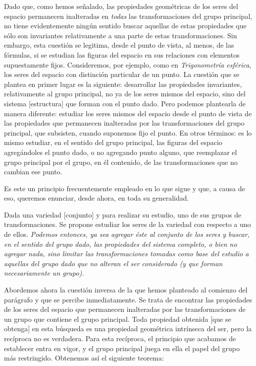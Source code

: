 \documentclass[a4paper, 12pt]{article}
\begin{document}
 Dado que, como hemos señalado, las propiedades geométricas de los seres del espacio permanecen inalteradas en \textit{todas} las transformaciones del grupo principal, no tiene evidentemente ningún sentido buscar aquellas de estas propiedades que sólo son invariantes relativamente a una parte de estas transformaciones. Sin embargo, esta cuestión se legitima, desde el punto de vista, al menos, de las fórmulas, si se estudian las figuras del espacio en sus relaciones con elementos supuestamente fijos. Consideremos, por ejemplo, como en \textit{Trigonometría esférica}, los seres del espacio con distinción particular de un punto. La cuestión que se plantea en primer lugar es la siguiente: desarrollar las propiedades invariantes, relativamente al grupo principal, no ya de los seres mismos del espacio, sino del sistema [estructura] que forman con el punto dado. Pero podemos plantearla de manera diferente: estudiar los seres mismos del espacio desde el punto de vista de las propiedades que permanecen inalteradas por las transformaciones del grupo principal, que subsisten, cuando suponemos fijo el punto. En otros términos: es lo mismo estudiar, en el sentido del grupo principal, las figuras del espacio agregándoles el punto dado, o no agregando punto alguno, que reemplazar el grupo principal por el grupo, en él contenido, de las transformaciones que no cambian ese punto.

Es este un principio frecuentemente empleado en lo que sigue y que, a causa de eso, queremos enunciar, desde ahora, en toda su generalidad.

Dada una variedad [conjunto] y para realizar su estudio, uno de sus grupos de transformaciones. Se propone estudiar los seres de la variedad con respecto a uno de ellos. \textit{Podemos entonces, ya sea agregar éste al conjunto de los seres y buscar, en el sentido del grupo dado, las propiedades del sistema completo, o bien no agregar nada, sino limitar las transformaciones tomadas como base del estudio a aquellas del grupo dado que no alteran el ser considerado (y que forman necesariamente un grupo).}

Abordemos ahora la cuestión inversa de la que hemos planteado al comienzo del parágrafo y que se percibe inmediatamente. Se trata de encontrar las propiedades de los seres del espacio que permanecen inalteradas por las transformaciones de un grupo que contiene el grupo principal. Toda propiedad obtenida [que se obtenga] en esta búsqueda es una propiedad geométrica intrínseca del ser, pero la recíproca no es verdadera. Para esta recíproca, el principio que acabamos de establecer entra en vigor, y el grupo principal juega en ella el papel del grupo más restringido. Obtenemos así el siguiente teorema:
\end{document}

